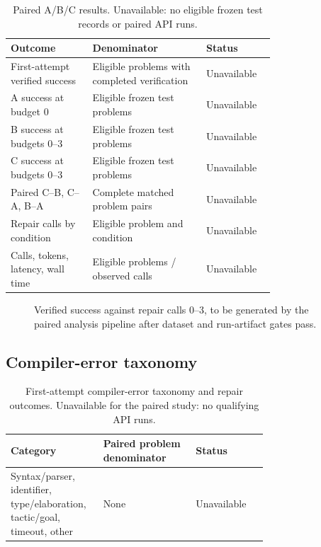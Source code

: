 \documentclass[runningheads,a4paper]{llncs}
\begin{document}
\begin{table}
\caption{Paired A/B/C results. Unavailable: no eligible frozen test records
or paired API runs.}\label{tab:abc}\centering
\begin{tabular}{p{0.31\linewidth}p{0.43\linewidth}l}\toprule
Outcome & Denominator & Status \\
\midrule
First-attempt verified success & Eligible problems with completed verification & Unavailable \\
A success at budget 0 & Eligible frozen test problems & Unavailable \\
B success at budgets 0--3 & Eligible frozen test problems & Unavailable \\
C success at budgets 0--3 & Eligible frozen test problems & Unavailable \\
Paired C--B, C--A, B--A & Complete matched problem pairs & Unavailable \\
Repair calls by condition & Eligible problem and condition & Unavailable \\
Calls, tokens, latency, wall time & Eligible problems / observed calls & Unavailable \\
\bottomrule\end{tabular}
\end{table}

\begin{figure}
\centering
{}
\caption{Verified success against repair calls 0--3, to be generated by the
paired analysis pipeline after dataset and run-artifact gates pass.}
\label{fig:budget}
\end{figure}

\subsection{Compiler-error taxonomy}
\begin{table}
\caption{First-attempt compiler-error taxonomy and repair outcomes.
Unavailable for the paired study: no qualifying API runs.}
\label{tab:errors}\centering
\begin{tabular}{p{0.36\linewidth}p{0.36\linewidth}l}\toprule
Category & Paired problem denominator & Status \\
\midrule
Syntax/parser, identifier, type/elaboration, tactic/goal, timeout, other & None & Unavailable \\
\bottomrule\end{tabular}
\end{table}
\end{document}
